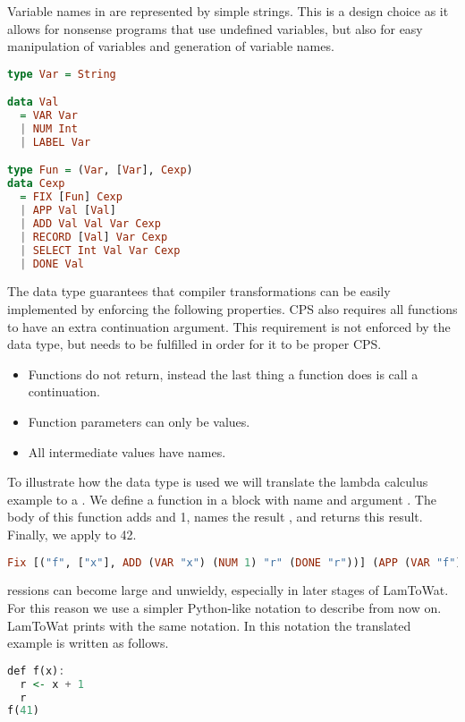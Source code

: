 {Variable names in  are represented by simple strings. This is a design choice as it allows for nonsense programs that use undefined variables, but also for easy manipulation of variables and generation of variable names.

\begin{lstlisting}[language=Haskell]
type Var = String

data Val
  = VAR Var
  | NUM Int
  | LABEL Var

type Fun = (Var, [Var], Cexp)
data Cexp
  = FIX [Fun] Cexp
  | APP Val [Val]
  | ADD Val Val Var Cexp
  | RECORD [Val] Var Cexp
  | SELECT Int Val Var Cexp
  | DONE Val
\end{lstlisting}

The  data type guarantees that compiler transformations can be easily implemented by enforcing the following properties. \ac{CPS} also requires all functions to have an extra continuation argument. This requirement is not enforced by the data type, but needs to be fulfilled in order for it to be proper \ac{CPS}.

\begin{itemize}
\item Functions do not return, instead the last thing a function does is call a continuation.
\item Function parameters can only be values.
\item All intermediate values have names.
\end{itemize}

To illustrate how the data type is used we will translate the lambda calculus example  to a . We define a function in a  block with name  and argument . The body of this function adds  and 1, names the result , and returns this result. Finally, we apply  to 42.

\begin{lstlisting}[language=Haskell]
  Fix [("f", ["x"], ADD (VAR "x") (NUM 1) "r" (DONE "r"))] (APP (VAR "f") [NUM 41])
\end{lstlisting}

ressions can become large and unwieldy, especially in later stages of LamToWat. For this reason we use a simpler Python-like notation to describe  from now on. LamToWat prints  with the same notation. In this notation the translated example is written as follows.

\begin{lstlisting}[language=Haskell]
def f(x):
  r <- x + 1
  r
f(41)
\end{lstlisting}

}
